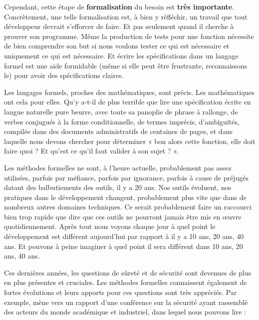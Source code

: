 \documentclass[middle]{zmdocument}
\begin{document}
Cependant, cette étape de \textbf{formalisation} du besoin est \textbf{très importante}. 
Concrètement, une telle formalisation est, à bien y réfléchir, un travail que 
tout développeur devrait s'efforcer de faire. Et pas seulement quand il cherche 
à prouver son programme. Même la production de tests pour une fonction 
nécessite de bien comprendre son but si nous voulons tester ce qui est nécessaire 
et uniquement ce qui est nécessaire. Et écrire les spécifications dans un 
langage formel est une aide formidable (même si elle peut être frustrante, 
reconnaissons le) pour avoir des spécifications claires.



Les langages formels, proches des mathématiques, sont précis. Les mathématiques
ont cela pour elles. Qu'y a-t-il de plus terrible que lire une spécification 
écrite en langue naturelle pure beurre, avec toute sa panoplie de phrase à 
rallonge, de verbes conjugués à la forme conditionnelle, de termes imprécis, 
d'ambiguïtés, compilée dans des documents administratifs de centaines de pages,
et dans laquelle nous devons chercher pour déterminer « bon alors cette fonction, 
elle doit faire quoi ? Et qu'est ce qu'il faut valider à son sujet ? ».



Les méthodes formelles ne sont, à l'heure actuelle, probablement pas assez 
utilisées, parfois par méfiance, parfois par ignorance, parfois à cause de 
préjugés datant des balbutiements des outils, il y a 20 ans. Nos outils
évoluent, nos pratiques dans le développement changent, probablement plus
vite que dans de nombreux autres domaines techniques. Ce serait probablement
faire un raccourci bien trop rapide que dire que ces outils ne pourront 
jamais être mis en œuvre quotidiennement. Après tout nous voyons chaque jour
à quel point le développement est différent aujourd'hui par rapport à il y a
10 ans, 20 ans, 40 ans. Et pouvons à peine imaginer à quel point il sera 
différent dans 10 ans, 20 ans, 40 ans.



Ces dernières années, les questions de sûreté et de sécurité sont devenues de
plus en plus présentes et cruciales. Les méthodes formelles connaissent également
de fortes évolutions et leurs apports pour ces questions sont très appréciés. 
Par exemple,  mène vers
un rapport d'une conférence sur la sécurité ayant rassemblé des acteurs du monde
académique et industriel, dans lequel nous pouvons lire :
\end{document}
